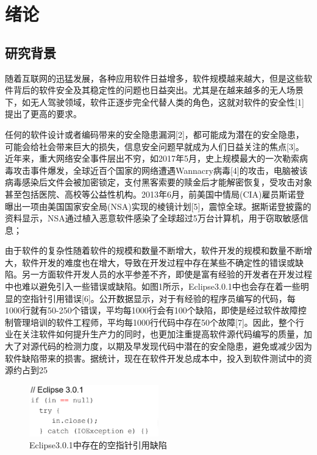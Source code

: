 \chapter{绪论}
\label{chap:intro}
\section{研究背景}

随着互联网的迅猛发展，各种应用软件日益增多，软件规模越来越大，但是这些软件背后的软件安全及其稳定性的问题也日益突出。尤其是在越来越多的无人场景下，如无人驾驶领域，软件正逐步完全代替人类的角色，这就对软件的安全性[1]提出了更高的要求。

任何的软件设计或者编码带来的安全隐患漏洞[2]，都可能成为潜在的安全隐患，可能会给社会带来巨大的损失，信息安全问题早就成为人们日益关注的焦点[3]。近年来，重大网络安全事件层出不穷，如2017年5月，史上规模最大的一次勒索病毒攻击事件爆发，全球近百个国家的网络遭遇Wannacry病毒[4]的攻击，电脑被该病毒感染后文件会被加密锁定，支付黑客索要的赎金后才能解密恢复，受攻击对象甚至包括医院、高校等公益性机构。2013年6月，前美国中情局(CIA)雇员斯诺登曝出一项由美国国家安全局(NSA)实现的棱镜计划[5]，震惊全球。据斯诺登披露的资料显示，NSA通过植入恶意软件感染了全球超过5万台计算机，用于窃取敏感信息；

由于软件的复杂性随着软件的规模和数量不断增大，软件开发的规模和数量不断增大，软件开发的难度也在增大，导致在开发过程中存在某些不确定性的错误或缺陷。另一方面软件开发人员的水平参差不齐，即使是富有经验的开发者在开发过程中也难以避免引入一些错误或缺陷。如图1所示，Eclipse3.0.1中也会存在着一些明显的空指针引用错误[6]。公开数据显示，对于有经验的程序员编写的代码，每1000行就有50-250个错误，平均每1000行会有100个缺陷，即使是经过软件故障控制管理培训的软件工程师，平均每1000行代码中存在50个故障[7]。因此，整个行业在关注软件如何提升生产力的同时，也更加注重提高软件源代码编写的质量，加大了对源代码的检测力度，以期及早发现代码中潜在的安全隐患，避免或减少因为软件缺陷带来的损害。据统计，现在在软件开发总成本中，投入到软件测试中的资源约占到25%

 \begin{figure}
 \centering
 \includegraphics[width=0.50\textwidth]{figures/NullPointer1-1}
 \caption{Eclipse3.0.1中存在的空指针引用缺陷}\label{fig:diagram}
\end{figure}

